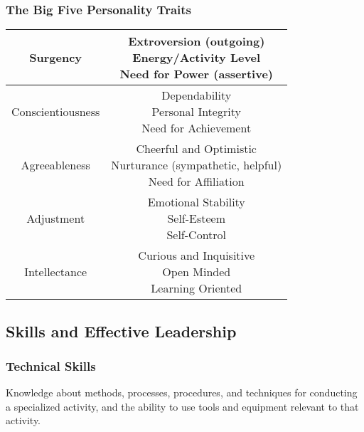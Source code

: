 
\subsubsection{The Big Five Personality Traits} %
\label{ssub:the_big_five_personality_traits}

\begin{center}
\begin{tabular}{ | c | c |}
	\hline
 Surgency & \pbox{30cm}{Extroversion (outgoing)\\ Energy/Activity Level \\ Need for Power (assertive)} \\ 
	\hline
 Conscientiousness & \pbox{30cm}{Dependability \\ Personal Integrity \\ Need for Achievement  }\\  
 	\hline
 Agreeableness & \pbox{30cm}{Cheerful and Optimistic \\ Nurturance (sympathetic, helpful) \\ Need for Affiliation }\\   
 	\hline 
 Adjustment & \pbox{30cm}{Emotional Stability \\ Self-Esteem \\ Self-Control} \\
 	\hline
 Intellectance & \pbox{30cm}{Curious and Inquisitive \\ Open Minded  \\Learning Oriented }\\    
 	\hline
\end{tabular}
\end{center}




\subsection{Skills and Effective Leadership} %
\label{ssub:skills_and_effective_leadership}

\subsubsection{Technical Skills} %
\label{ssub:technical_skills}
	Knowledge about methods, processes, procedures, and techniques for conducting a specialized activity, and the ability to use tools and equipment relevant to that activity.

